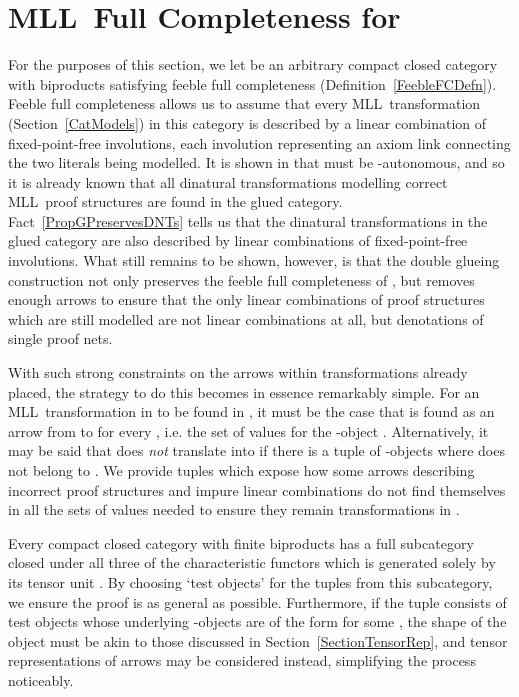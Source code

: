 \documentclass{LMCS}
\theoremstyle{plain}\newtheorem*{cLm}{Claim}
\newcommand{\mll}{MLL} \newcommand{\mall}{MALL}
\newcommand{\p}{} \newcommand{\N}{\mathbb{N}}
\begin{document}
\section{\mll~Full Completeness for } \label{SectionGCFC}

For the purposes of this section, we let  be an arbitrary compact closed category with biproducts satisfying feeble full completeness (Definition~\ref{FeebleFCDefn}). Feeble full completeness allows us to assume that every \mll~transformation (Section~\ref{CatModels}) in this category is described by a linear combination of fixed-point-free involutions, each involution representing an axiom link connecting the two literals being modelled. It is shown in \cite{Tan97,HS03} that  must be -autonomous, and so it is already known that all dinatural transformations modelling correct \mll~proof structures are found in the glued category. Fact~\ref{PropGPreservesDNTs} tells us that the dinatural transformations in the glued category are also described by linear combinations of fixed-point-free involutions. What still remains to be shown, however, is that the double glueing construction not only preserves the feeble full completeness of , but removes enough arrows to ensure that the only linear combinations of proof structures which are still modelled are not linear combinations at all, but denotations of single proof nets.

\p With such strong constraints on the arrows within transformations already placed, the strategy to do this becomes in essence remarkably simple. For an \mll~transformation  in  to be found in , it must be the case that  is found as an arrow from  to  for every , i.e. the set of values for the -object . Alternatively, it may be said that  does \emph{not} translate into  if there is a tuple of -objects  where  does not belong to . We provide tuples which expose how some arrows describing incorrect proof structures and impure linear combinations do not find themselves in all the sets of values needed to ensure they remain transformations in .

Every compact closed category with finite biproducts has a full subcategory closed under all three of the characteristic functors which is generated solely by its tensor unit . By choosing `test objects' for the tuples from this subcategory, we ensure the proof is as general as possible. Furthermore, if the tuple  consists of test objects whose underlying -objects are of the form  for some , the shape of the object  must be akin to those discussed in Section~\ref{SectionTensorRep}, and tensor representations of arrows may be considered instead, simplifying the process noticeably.
\end{document}
